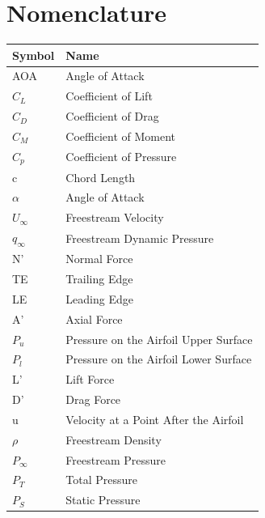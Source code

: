 \documentclass[11pt, letterpaper]{article}
\begin{document}
\tableofcontents
{}
\singlespacing

\newpage

\section{Nomenclature}

\begin{table}[h]
    \centering
    \begin{tabular}{p{5cm}p{11cm}}
        \hline
        Symbol & Name \\
        \hline
        AOA & Angle of Attack\\
        $C_L$ & Coefficient of Lift\\
        $C_D$ & Coefficient of Drag\\
        $C_M$ & Coefficient of Moment\\
        $C_p$ & Coefficient of Pressure\\
        c & Chord Length\\
        $\alpha$ & Angle of Attack\\
        $U_\infty$ & Freestream Velocity\\
        $q_\infty$ & Freestream Dynamic Pressure\\
        N' & Normal Force\\
        TE & Trailing Edge\\
        LE & Leading Edge\\
        A' & Axial Force\\
        $P_u$ & Pressure on the Airfoil Upper Surface\\
        $P_l$ & Pressure on the Airfoil Lower Surface\\
        L' & Lift Force\\
        D' & Drag Force\\
        u & Velocity at a Point After the Airfoil\\
        $\rho$ & Freestream Density\\
        $P_\infty$ & Freestream Pressure\\
        $P_T$ & Total Pressure\\
        $P_S$ & Static Pressure\\

        \hline
    \end{tabular}
    \label{tab:nomenclature}
\end{table}
        
\newpage
    
\end{document}
